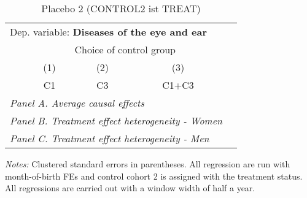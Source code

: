  \begin{table}[H] \centering \begin{threeparttable} \caption{Placebo 2 (CONTROL2 ist TREAT) } {\def\sym#1{\ifmmode^{#1}\else\(^{#1}\)\fi} \begin{tabular}{l*{4}{c}} \toprule \multicolumn{4}{l}{Dep. variable: \textbf{Diseases of the eye and ear}} \\ & \multicolumn{3}{c}{Choice of control group} \\ \cmidrule(lr){2-4}
            &\multicolumn{1}{c}{(1)}&\multicolumn{1}{c}{(2)}&\multicolumn{1}{c}{(3)}\\
            &\multicolumn{1}{c}{C1}&\multicolumn{1}{c}{C3}&\multicolumn{1}{c}{C1+C3}\\
\midrule
 \multicolumn{4}{l}{\emph{Panel A. Average causal effects}} \\      \midrule\multicolumn{4}{l}{\emph{Panel B. Treatment effect heterogeneity - Women}} \\      \midrule\multicolumn{4}{l}{\emph{Panel C. Treatment effect heterogeneity - Men}} \\      
\bottomrule \end{tabular} } \begin{tablenotes} \item \scriptsize \emph{Notes:} Clustered standard errors in parentheses. All regression are run with month-of-birth FEs and control cohort 2 is assigned with the treatment status. All regressions are carried out with a window width of half a year. \end{tablenotes} \end{threeparttable} \end{table} 
